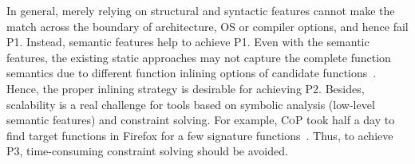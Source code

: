 In general, merely relying on structural and syntactic features cannot make the match across the boundary of architecture, OS or compiler options, and hence fail P1. Instead, semantic features help to achieve P1. Even with the semantic features, the existing static  approaches may not capture the complete function semantics due to different function inlining options of candidate functions~\cite{DBLP:conf/sp/PewnyGGRH15}. %
Hence, the proper inlining strategy is desirable for achieving P2. Besides, scalability is a real challenge for tools \cite{luo2014semantics,DBLP:conf/sp/PewnyGGRH15} based on symbolic analysis (low-level semantic features) and constraint solving. For example, \textsc{CoP} took half a day to find target functions in Firefox for a few signature functions~\cite{luo2014semantics}. Thus, to achieve P3, time-consuming constraint solving should be avoided.





